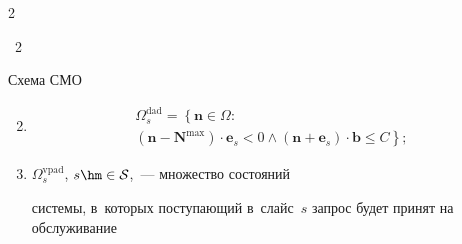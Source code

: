 \begin{multicols}{2}
{\begin{center}
{


}








\vspace*{3pt}








\noindent


{{\figurename~2}\ \ \small{Схема СМО


}}


\end{center}


}





\vspace*{-12pt}





\addtocounter{figure}{1}





\begin{enumerate}[(1)]


\setcounter{enumi}{1}


\item[\,]





\noindent


\begin{multline}


\label{eq:SetAdmission}


\Omega_s^{\mathrm{dad}} =


\left\{


\mathbf{n} \in \Omega: \right.\\ \left.


\left(\mathbf{n}-\mathbf{N}^{\max}\right) \cdot \mathbf{e}_s < 0


\land


\left(\mathbf{n} + \mathbf{e}_s \right) \cdot \mathbf{b} \leq C


\right\};


\end{multline}


\item $\Omega_s^{\mathrm{vpad}}$, $s\hm\in\mathcal{S}$,~--- множество состояний 


системы, в~которых поступающий в~слайс~$s$ запрос будет принят на обслуживание 



\end{enumerate}
\end{multicols}
